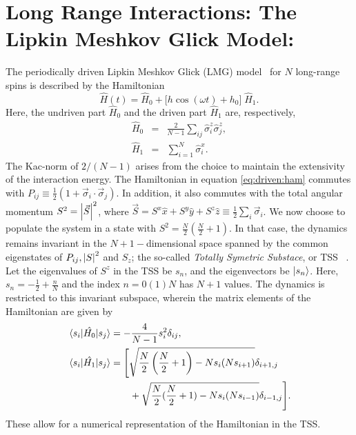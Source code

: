 \documentclass[%
reprint,
superscriptaddress,
linenumbers,
amsmath,amssymb,
aps,
prb,
showkeys,
]{revtex4-2}
\begin{document}
	\section{\label{sec:level3}Long Range Interactions: The Lipkin Meshkov Glick Model: }	
	The periodically driven {Lipkin Meshkov Glick (LMG)} model~\cite{lmg1965_1,defenu2018} for $N$ long-range spins is described by the Hamiltonian
	\begin{equation}
		\hat{H}(t) = \hat{H}_0 + \big[h \cos{(\omega t)} + h_0\big]\; \hat{H}_1.
		\label{eq:driven:ham}
	\end{equation}
	Here, the undriven part $\hat{H}_0$ and the driven part $\hat{H}_1$ are, respectively, 
	\begin{eqnarray}
		\hat{H}_0 &=& \frac{2}{N-1} \sum_{ij}\hat{\sigma}^z_i\hat{\sigma}^z_j,\nonumber \\
		\hat{H}_1 &=& \sum^N_{i=1}\hat{\sigma}^x_i.
	\end{eqnarray}
	{The Kac-norm of $2/(N-1)$ arises from the choice to maintain the extensivity of the interaction energy}. The Hamiltonian in equation \ref{eq:driven:ham} commutes with $P_{ij} \equiv \displaystyle\frac{1}{2}\left(1+ \vec{\sigma}_i\cdot\vec{\sigma}_j\right)$. In addition, it also commutes with the total angular momentum $S^2 = \abs{\vec{S}}^2$, where $\vec{S}=S^x\hat{x}+S^y\hat{y}+S^z\hat{z}\equiv\frac12 \sum_i \vec{\sigma}_i$. We now choose to populate the system in a state with $S^2=\displaystyle\frac{N}{2}\left(\frac{N}{2}+1\right)$. In that case, the dynamics remains invariant in the  $N+1-$dimensional space spanned by the common eigenstates of $P_{ij}, \abs{S}^2$ and $S_z$; the so-called \textit{ Totally Symetric Substace}, or TSS ~\cite{mori_prethermalization_2019}. Let the eigenvalues of $S^z$ in the TSS be $s_n$, and the eigenvectors be $\ket{s_n}$. Here, $s_n=-\frac{1}{2}+\frac{n}{N}$ and the index
	$n= 0 (1) N$ has $N+1$ values. The dynamics is restricted to this invariant subspace, wherein the matrix elements of the Hamiltonian are given by
	\begin{align}
		\mel{s_i}{\hat{H_0}}{s_j} &= -\frac{4}{N-1} s^2_i \delta_{ij},\nonumber\\
		\mel{s_i}{\hat{H_1}}{s_j} &= \Bigg[\sqrt{\frac{N}{2}\left(\frac{N}{2}+1\right) - Ns_i(Ns_{i + 1})}\delta_{i+1, j} \nonumber\\ 
		&\hskip 0.7cm +\sqrt{\frac{N}{2}(\frac{N}{2}+1) - Ns_i(Ns_{i- 1})}\delta_{i-1,j}\Bigg].
		\label{eq:lmg:tssham}
	\end{align}
	These allow for a numerical representation of the Hamiltonian in the TSS.
	
\end{document}
